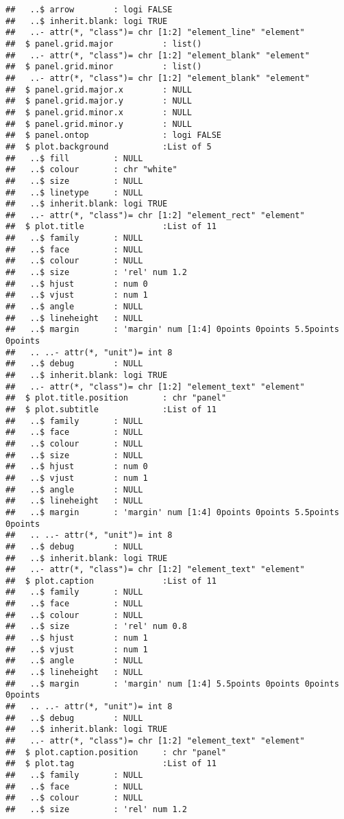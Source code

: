 \documentclass[
]{article}
\begin{document}
\begin{verbatim}
##   ..$ arrow        : logi FALSE
##   ..$ inherit.blank: logi TRUE
##   ..- attr(*, "class")= chr [1:2] "element_line" "element"
##  $ panel.grid.major          : list()
##   ..- attr(*, "class")= chr [1:2] "element_blank" "element"
##  $ panel.grid.minor          : list()
##   ..- attr(*, "class")= chr [1:2] "element_blank" "element"
##  $ panel.grid.major.x        : NULL
##  $ panel.grid.major.y        : NULL
##  $ panel.grid.minor.x        : NULL
##  $ panel.grid.minor.y        : NULL
##  $ panel.ontop               : logi FALSE
##  $ plot.background           :List of 5
##   ..$ fill         : NULL
##   ..$ colour       : chr "white"
##   ..$ size         : NULL
##   ..$ linetype     : NULL
##   ..$ inherit.blank: logi TRUE
##   ..- attr(*, "class")= chr [1:2] "element_rect" "element"
##  $ plot.title                :List of 11
##   ..$ family       : NULL
##   ..$ face         : NULL
##   ..$ colour       : NULL
##   ..$ size         : 'rel' num 1.2
##   ..$ hjust        : num 0
##   ..$ vjust        : num 1
##   ..$ angle        : NULL
##   ..$ lineheight   : NULL
##   ..$ margin       : 'margin' num [1:4] 0points 0points 5.5points 0points
##   .. ..- attr(*, "unit")= int 8
##   ..$ debug        : NULL
##   ..$ inherit.blank: logi TRUE
##   ..- attr(*, "class")= chr [1:2] "element_text" "element"
##  $ plot.title.position       : chr "panel"
##  $ plot.subtitle             :List of 11
##   ..$ family       : NULL
##   ..$ face         : NULL
##   ..$ colour       : NULL
##   ..$ size         : NULL
##   ..$ hjust        : num 0
##   ..$ vjust        : num 1
##   ..$ angle        : NULL
##   ..$ lineheight   : NULL
##   ..$ margin       : 'margin' num [1:4] 0points 0points 5.5points 0points
##   .. ..- attr(*, "unit")= int 8
##   ..$ debug        : NULL
##   ..$ inherit.blank: logi TRUE
##   ..- attr(*, "class")= chr [1:2] "element_text" "element"
##  $ plot.caption              :List of 11
##   ..$ family       : NULL
##   ..$ face         : NULL
##   ..$ colour       : NULL
##   ..$ size         : 'rel' num 0.8
##   ..$ hjust        : num 1
##   ..$ vjust        : num 1
##   ..$ angle        : NULL
##   ..$ lineheight   : NULL
##   ..$ margin       : 'margin' num [1:4] 5.5points 0points 0points 0points
##   .. ..- attr(*, "unit")= int 8
##   ..$ debug        : NULL
##   ..$ inherit.blank: logi TRUE
##   ..- attr(*, "class")= chr [1:2] "element_text" "element"
##  $ plot.caption.position     : chr "panel"
##  $ plot.tag                  :List of 11
##   ..$ family       : NULL
##   ..$ face         : NULL
##   ..$ colour       : NULL
##   ..$ size         : 'rel' num 1.2

\end{verbatim}
\end{document}
